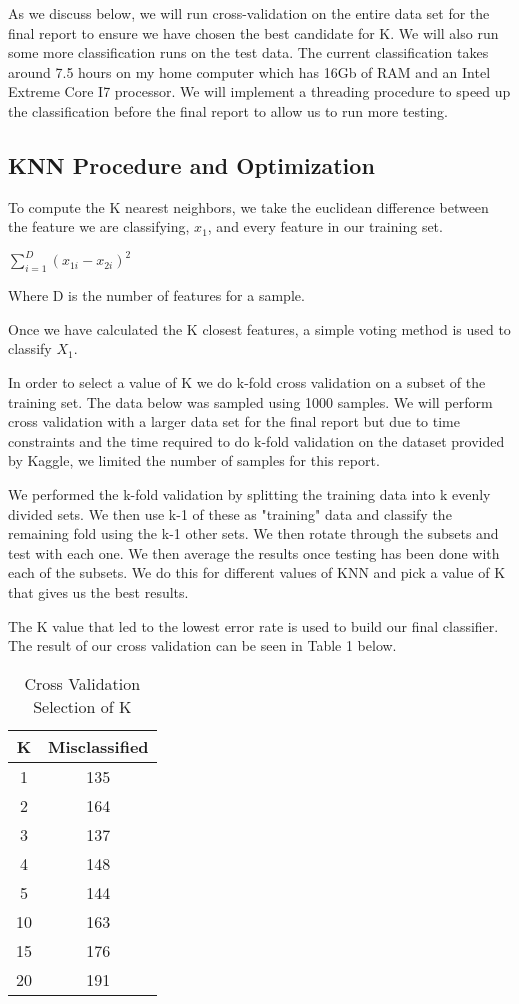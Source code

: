 \documentclass{article} %
\begin{document}
As we discuss below, we will run cross-validation on the entire data set for the final report to ensure we have chosen the best candidate for K.  We will also run some more classification runs on the test data.  The current classification takes around 7.5 hours on my home computer which has 16Gb of RAM and an Intel Extreme Core I7 processor.  We will implement a threading procedure to speed up the classification before the final report to allow us to run more testing. 

\subsection{KNN Procedure and Optimization}

To compute the K nearest neighbors, we take the euclidean difference between the feature we are classifying, $x_1$, and every feature in our training set.

\begin{center}
$\sum\limits_{i=1}^D {(x_{1i} - x_{2i})^2}$
\end{center}
Where D is the number of features for a sample. 

Once we have calculated the K closest features, a simple voting method is used to classify $X_1$.

In order to select a value of K we do k-fold cross validation on a subset of the training set. The data below was sampled using 1000 samples.  We will perform cross validation with a larger data set for the final report but due to time constraints and the time required to do k-fold validation on the dataset provided by Kaggle, we limited the number of samples for this report.

We performed the k-fold validation by splitting the training data into k evenly divided sets.  We then use k-1 of these as "training" data and classify the remaining fold using the k-1 other sets.  We then rotate through the subsets and test with each one. We then average the results once testing has been done with each of the subsets.  We do this for different values of KNN and pick a value of K that gives us the best results. 

The K value that led to the lowest error rate is used to build our final classifier. The result of our cross validation can be seen in Table 1 below.

\begin{table}[ht]
\caption{Cross Validation Selection of K} %
\centering  %
\begin{tabular}{c c} 
\hline\hline
K & Misclassified \\ [1.0ex]
\hline 
1 & 135 \\
2 & 164 \\
3 & 137 \\
4 & 148 \\
5 & 144 \\
10 & 163 \\
15 & 176 \\
20 & 191 \\ [1ex]
\hline
\end{tabular}
\label{table:nonlin}
\end{table}
\end{document}
